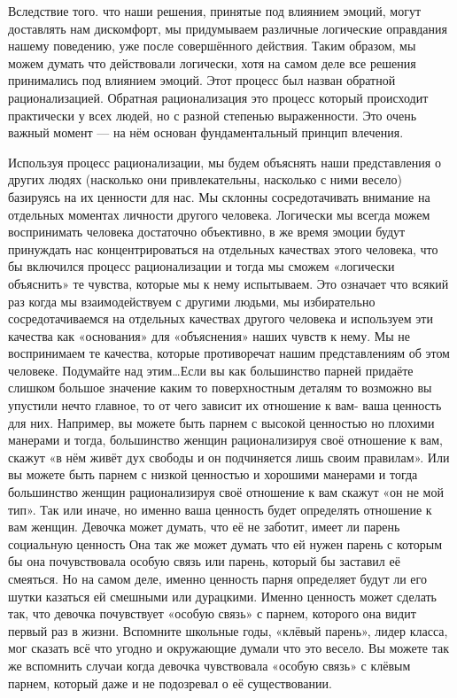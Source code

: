 Вследствие того. что наши решения, принятые под влиянием эмоций, могут доставлять нам дискомфорт, мы придумываем различные логические оправдания нашему поведению, уже после совершённого действия. Таким образом, мы можем думать что действовали логически, хотя на самом деле все решения принимались под влиянием эмоций. Этот процесс был назван обратной рационализацией. Обратная рационализация это процесс который происходит практически у всех людей, но с разной степенью выраженности. Это очень важный момент --- на нём основан фундаментальный принцип влечения.

\RULE  Используя процесс рационализации, мы будем объяснять наши представления о других людях (насколько они привлекательны, насколько с ними весело) базируясь на их ценности для нас. Мы склонны сосредотачивать внимание на отдельных моментах личности другого человека. Логически мы всегда можем воспринимать человека достаточно объективно, в же время эмоции будут принуждать нас концентрироваться на отдельных качествах этого человека, что бы включился процесс рационализации и тогда мы сможем «логически объяснить» те чувства, которые мы к нему испытываем. Это означает что всякий раз когда мы взаимодействуем с другими людьми, мы избирательно сосредотачиваемся на отдельных качествах другого человека и используем эти качества как «основания» для «объяснения» наших чувств к нему. Мы не воспринимаем те качества, которые противоречат нашим представлениям об этом человеке. Подумайте над этим\ldots Если вы как большинство парней придаёте слишком большое значение каким то поверхностным деталям то возможно вы упустили нечто главное, то от чего зависит их отношение к вам- ваша ценность для них. Например, вы можете быть парнем с высокой ценностью но плохими манерами и тогда, большинство женщин рационализируя своё отношение к вам, скажут «в нём живёт дух свободы и он подчиняется лишь своим правилам». Или вы можете быть парнем с низкой ценностью и хорошими манерами и тогда большинство женщин рационализируя своё отношение к вам скажут «он не мой тип». Так или иначе, но именно ваша ценность будет определять отношение к вам женщин. Девочка может думать, что её не заботит, имеет ли парень социальную ценность Она так же может думать что ей нужен парень с которым бы она почувствовала особую связь или парень, который бы заставил её смеяться. Но на самом деле, именно ценность парня определяет будут ли его шутки казаться ей смешными или дурацкими. Именно ценность может сделать так, что девочка почувствует «особую связь» с парнем, которого она видит первый раз в жизни. Вспомните школьные годы, «клёвый парень», лидер класса, мог сказать всё что угодно и окружающие думали что это весело. Вы можете так же вспомнить случаи когда девочка чувствовала «особую связь» с клёвым парнем, который даже и не подозревал о её существовании.

